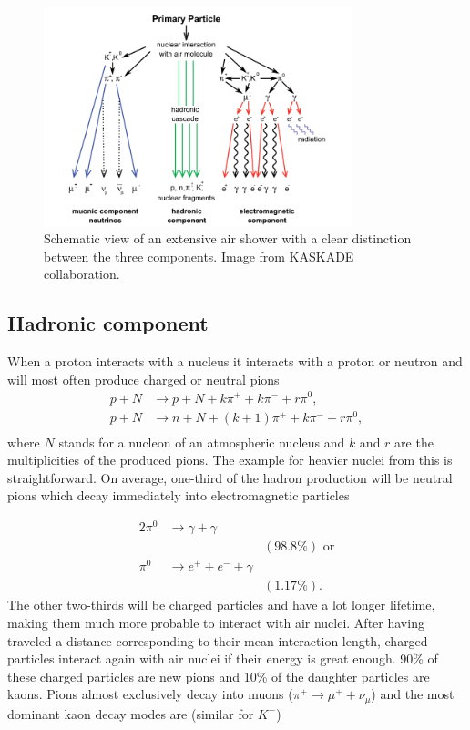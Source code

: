 \begin{figure}
\centering
\includegraphics[width=0.8\textwidth]{chapter3/img/airshower.png}
\caption{Schematic view of an extensive air shower with a clear distinction between the three components. Image from KASKADE collaboration.}
\label{fig:airshower}
\end{figure} 

\subsection{Hadronic component}
When a proton interacts with a nucleus it interacts with a proton or neutron and will most often produce charged or neutral pions
\begin{equation}
\begin{split}
p+N &\rightarrow p+N + k\pi^+ + k\pi^- +r\pi^0,\\
p+N &\rightarrow n+N + (k+1)\pi^+ + k\pi^- + r\pi^0,\\
\end{split}
\end{equation}
where $N$ stands for a nucleon of an atmospheric nucleus and $k$ and $r$ are the multiplicities of the produced pions. The example for heavier nuclei from this is straightforward. On average, one-third of the hadron production will be neutral pions which decay immediately into electromagnetic particles 

\begin{alignat}{2}
\pi^0 &\rightarrow \gamma  +\gamma \\ &&(98.8\%) \textrm{ or}\\
\pi^0 &\rightarrow e^+ + e^- + \gamma \\ &&(1.17\%).
\end{alignat}
The other two-thirds will be charged particles and have a lot longer lifetime, making them much more probable to interact with air nuclei. After having traveled a distance corresponding to their mean interaction length, charged particles interact again with air nuclei if their energy is great enough. 90\% of these charged particles are new pions and 10\% of the daughter particles are kaons. Pions almost exclusively decay into muons ($\pi^+ \rightarrow \mu^+ + \nu_{\mu}$) and the most dominant kaon decay modes are (similar for $K^-$) \cite{pdg}

